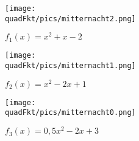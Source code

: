 \begin{minipage}{\textwidth}
	\begin{minipage}{0.33\textwidth}
		
		\texttt{[image: \\quadFkt/pics/mitternacht2.png]}
		
		\(f_1(x)=x^2+x-2\)
	\end{minipage}%
	\begin{minipage}{0.33\textwidth}
		
		\texttt{[image: \\quadFkt/pics/mitternacht1.png]}
		
		\(f_2(x)=x^2-2x+1\)
	\end{minipage}%
	\begin{minipage}{0.33\textwidth}
		
		\texttt{[image: \\quadFkt/pics/mitternacht0.png]}
		
		\(f_3(x)=0,5x^2-2x+3\)
	\end{minipage}%
\end{minipage}

\bigskip

\begin{minipage}{\textwidth}
	\begin{minipage}{0.33\textwidth}
		\centering{\(\textcolor{loes}{x^2+x-2=0}\)}
	\end{minipage}%
	\begin{minipage}{0.33\textwidth}
		\centering{\(\textcolor{loes}{x^2+2x+1=0}\)}
	\end{minipage}%
	\begin{minipage}{0.33\textwidth}
		\centering{\(\textcolor{loes}{0,5x^2+2x+3=0}\)}
	\end{minipage}%
\end{minipage}

\bigskip

